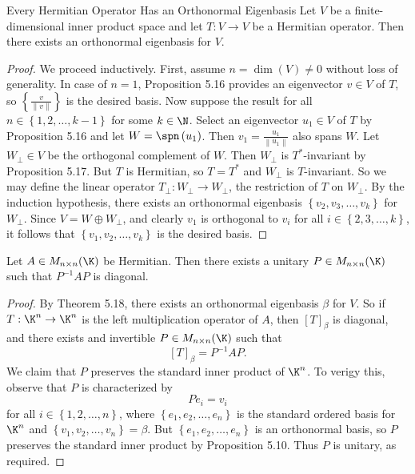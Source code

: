 \documentclass[linearalgebraII]{subfiles}
\begin{document}
    \begin{theorem}{Every Hermitian Operator Has an Orthonormal Eigenbasis}
        Let $V$ be a finite-dimensional inner product space and let $T:V\to V$ be a Hermitian operator. Then there exists an orthonormal eigenbasis for $V$.
    \end{theorem}

    \begin{proof}
        We proceed inductively. First, assume $n=\dim(V)\neq 0$ without loss of generality. In case of $n=1$, Proposition 5.16 provides an eigenvector $v\in V$ of $T$, so $\left\lbrace \frac{v}{\left\lVert v\right\rVert } \right\rbrace$ is the desired basis. Now suppose the result for all $n\in\left\lbrace 1,2,\ldots,k-1 \right\rbrace$ for some $k\in\N$. Select an eigenvector $u_1\in V$ of $T$ by Proposition 5.16 and let $W = \spn\left( u_1 \right)$. Then $v_1 = \frac{u_1}{\left\lVert u_1\right\rVert }$ also spans $W$. Let $W_\perp\in V$ be the orthogonal complement of $W$. Then $W_\perp$ is $T^*$-invariant by Proposition 5.17. But $T$ is Hermitian, so $T=T^*$ and $W_\perp$ is $T$-invariant. So we may define the linear operator $T_\perp: W_\perp\to W_\perp$, the restriction of $T$ on $W_\perp$. By the induction hypothesis, there exists an orthonormal eigenbasis $\left\lbrace v_2,v_3,\ldots,v_k \right\rbrace$ for $W_\perp$. Since $V=W\oplus W_\perp$, and clearly $v_1$ is orthogonal to $v_i$ for all $i\in\left\lbrace 2,3,\ldots,k \right\rbrace$, it follows that $\left\lbrace v_1,v_2,\ldots,v_k \right\rbrace$ is the desired basis.
    \end{proof}

    \begin{cor}{}
        Let $A\in M_{n\times n}(\K)$ be Hermitian. Then there exists a unitary $P\in M_{n\times n}(\K)$ such that $P^{-1}AP$ is diagonal.
    \end{cor}	

    \begin{proof}
        By Theorem 5.18, there exists an orthonormal eigenbasis $\beta$ for $V$. So if $T:\K^n\to\K^n$ is the left multiplication operator of $A$, then $\left[ T \right] _\beta$ is diagonal, and there exists and invertible $P\in M_{n\times n}(\K)$ such that 
        \begin{equation*}
            \left[ T \right] _\beta = P^{-1}AP.
        \end{equation*}
        We claim that $P$ preserves the standard inner product of $\K^n$. To verigy this, observe that $P$ is characterized by
        \begin{equation*}
            Pe_i = v_i
        \end{equation*}
        for all $i\in\left\lbrace 1,2,\ldots,n \right\rbrace$, where $\left\lbrace e_1,e_2,\ldots,e_n \right\rbrace$ is the standard ordered basis for $\K^n$ and $\left\lbrace v_1,v_2,\ldots,v_n \right\rbrace = \beta$. But $\left\lbrace e_1,e_2,\ldots,e_n \right\rbrace$ is an orthonormal basis, so $P$ preserves the standard inner product by Proposition 5.10. Thus $P$ is unitary, as required.
    \end{proof}
\end{document}
